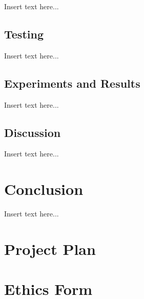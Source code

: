 \documentclass[12pt]{report} %
\begin{document}
Insert text here...

\section{Testing}

Insert text here...

\section{Experiments and Results}

Insert text here...

\section{Discussion}

Insert text here...

\chapter{Conclusion}

Insert text here...



\appendix

\chapter{Project Plan}

\chapter{Ethics Form}
\end{document}
